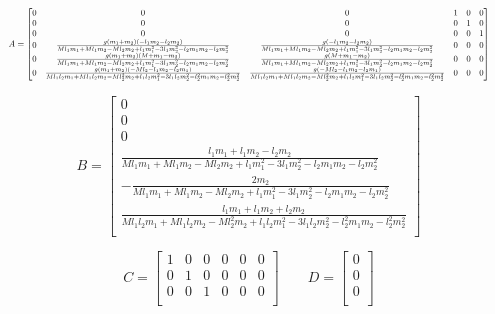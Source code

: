\documentclass[10pt]{article}
\begin{document}
    \begin{equation*}
        \resizebox{\textwidth}{!}{$
        A = 
        \begin{bmatrix}
            0 & 0 & 0 & 1 & 0 & 0 \\
            0 & 0 & 0 & 0 & 1 & 0 \\
            0 & 0 & 0 & 0 & 0 & 1 \\
            0 & \frac{g(m_1 + m_2)(-l_1m_2 - l_2m_2)}{Ml_1m_1 + Ml_1m_2 - Ml_2m_2 + l_1m_1^2 - 3l_1m_2^2 - l_2m_1m_2 - l_2m_2^2} & \frac{g(-l_1m_2 - l_2m_2)}{Ml_1m_1 + Ml_1m_2 - Ml_2m_2 + l_1m_1^2 - 3l_1m_2^2 - l_2m_1m_2 - l_2m_2^2} & 0 & 0 & 0 \\
            0 & \frac{g(m_1 + m_2)(M + m_1 - m_2)}{Ml_1m_1 + Ml_1m_2 - Ml_2m_2 + l_1m_1^2 - 3l_1m_2^2 - l_2m_1m_2 - l_2m_2^2} & \frac{g(M + m_1 - m_2)}{Ml_1m_1 + Ml_1m_2 - Ml_2m_2 + l_1m_1^2 - 3l_1m_2^2 - l_2m_1m_2 - l_2m_2^2} & 0 & 0 & 0 \\
            0 & \frac{g(m_1 + m_2)(-Ml_2 - l_1m_2 - l_2m_1)}{Ml_1l_2m_1 + Ml_1l_2m_2 - Ml_2^2m_2 + l_1l_2m_1^2 - 3l_1l_2m_2^2 - l_2^2m_1m_2 - l_2^2m_2^2} & \frac{g(-Ml_2 - l_1m_2 - l_2m_1)}{Ml_1l_2m_1 + Ml_1l_2m_2 - Ml_2^2m_2 + l_1l_2m_1^2 - 3l_1l_2m_2^2 - l_2^2m_1m_2 - l_2^2m_2^2} & 0 & 0 & 0
        \end{bmatrix}$}
    \end{equation*}
    
    \begin{equation*}
        B = 
        \begin{bmatrix}
            0 \\
            0 \\
            0 \\
            \frac{l_1 m_1 + l_1 m_2 - l_2 m_2}{Ml_1m_1 + Ml_1m_2 - Ml_2m_2 + l_1m_1^2 - 3l_1m_2^2 - l_2m_1m_2 - l_2m_2^2} \\
            -\frac{2m_2}{Ml_1m_1 + Ml_1m_2 - Ml_2m_2 + l_1m_1^2 - 3l_1m_2^2 - l_2m_1m_2 - l_2m_2^2} \\
            \frac{l_1m_1 + l_1m_2 + l_2m_2}{Ml_1l_2m_1 + Ml_1l_2m_2 - Ml_2^2m_2 + l_1l_2m_1^2 - 3l_1l_2m_2^2 - l_2^2m_1m_2 - l_2^2m_2^2} \\
        \end{bmatrix}
    \end{equation*}

    \begin{equation*}
        C = 
        \begin{bmatrix}
            1&0&0&0&0&0\\
            0&1&0&0&0&0\\
            0&0&1&0&0&0\\
        \end{bmatrix}
        \qquad D= 
        \begin{bmatrix}
            0\\
            0\\
            0\\
        \end{bmatrix}
    \end{equation*}
\end{document}
